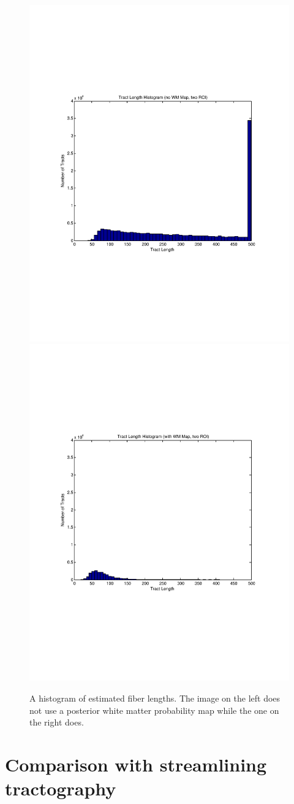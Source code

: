 \begin{figure} \label{fig:twolengthhistograms}
	\includegraphics[trim = 20mm 70mm 20mm 70mm, clip, width=0.5\linewidth]
	  {hist_length_nomask_two}
	\includegraphics[trim = 20mm 70mm 20mm 70mm, clip, width=0.5\linewidth]
	  {hist_length_mask_two}
	\caption{A histogram of estimated fiber lengths.  The image on the left does not use a posterior white matter probability map while the one on the right does. }
\end{figure}

\section{Comparison with streamlining tractography}

